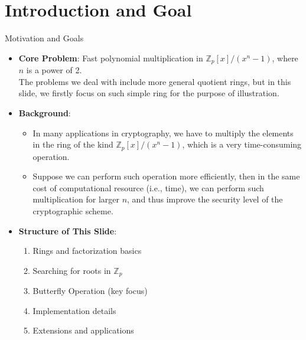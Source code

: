 \section{Introduction and Goal}

\begin{frame}{Motivation and Goals}
  \begin{itemize}
    \item \textbf{Core Problem}: Fast polynomial multiplication in 
          \(\mathbb{Z}_{p}[x]/(x^n - 1)\), where \(n\) is a power of 2.\\
          The problems we deal with include more general quotient rings, 
          but in this slide, we firstly focus on such simple ring 
          for the purpose of illustration.
    \item \textbf{Background}:
          \begin{itemize}
            \item In many applications in cryptography, we have to multiply the elements
                  in the ring of the kind \(\mathbb{Z}_{p}[x]/(x^n - 1)\), 
                  which is a very time-consuming operation.
            \item Suppose we can perform such operation more efficiently, 
                  then in the same cost of computational resource (i.e., time),
                  we can perform such multiplication for larger \(n\), 
                  and thus improve the security level of the cryptographic scheme.
          \end{itemize}
    \item \textbf{Structure of This Slide}:
          \begin{enumerate}
            \item Rings and factorization basics
            \item Searching for roots in \(\mathbb{Z}_p\)
            \item \alert{Butterfly Operation} (key focus)
            \item Implementation details
            \item Extensions and applications
          \end{enumerate}
  \end{itemize}
\end{frame}

